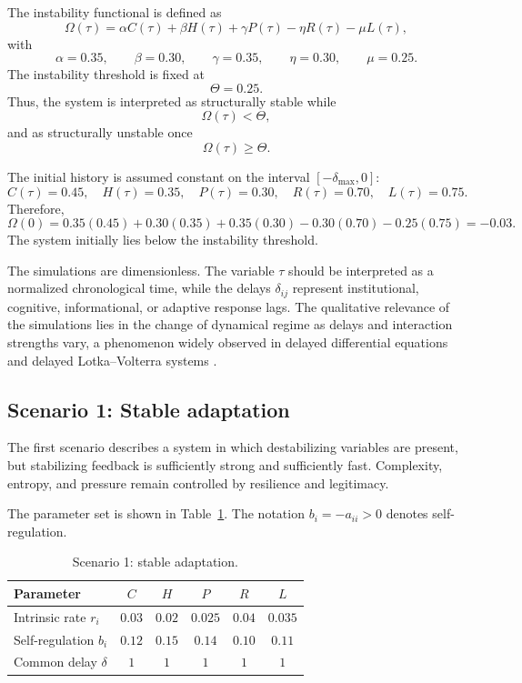 \documentclass[11pt]{article}
\begin{document}
The instability functional is defined as
\[
\Omega(\tau)
=
\alpha C(\tau)
+
\beta H(\tau)
+
\gamma P(\tau)
-
\eta R(\tau)
-
\mu L(\tau),
\]
with
\[
\alpha=0.35,\qquad
\beta=0.30,\qquad
\gamma=0.35,\qquad
\eta=0.30,\qquad
\mu=0.25.
\]
The instability threshold is fixed at
\[
\Theta=0.25.
\]
Thus, the system is interpreted as structurally stable while
\[
\Omega(\tau)<\Theta,
\]
and as structurally unstable once
\[
\Omega(\tau)\geq\Theta.
\]

The initial history is assumed constant on the interval \([-\delta_{\max},0]\):
\[
C(\tau)=0.45,\quad
H(\tau)=0.35,\quad
P(\tau)=0.30,\quad
R(\tau)=0.70,\quad
L(\tau)=0.75.
\]
Therefore,
\[
\Omega(0)
=
0.35(0.45)+0.30(0.35)+0.35(0.30)-0.30(0.70)-0.25(0.75)
=
-0.03.
\]
The system initially lies below the instability threshold.

The simulations are dimensionless. The variable \(\tau\) should be interpreted as a normalized chronological time, while the delays \(\delta_{ij}\) represent institutional, cognitive, informational, or adaptive response lags. The qualitative relevance of the simulations lies in the change of dynamical regime as delays and interaction strengths vary, a phenomenon widely observed in delayed differential equations and delayed Lotka--Volterra systems \cite{rihan2021dde,saeedian2022delay,chenjiang2021turinghopf}.

\subsection{Scenario 1: Stable adaptation}

The first scenario describes a system in which destabilizing variables are present, but stabilizing feedback is sufficiently strong and sufficiently fast. Complexity, entropy, and pressure remain controlled by resilience and legitimacy.

The parameter set is shown in Table~\ref{tab:scenario1}. The notation \(b_i=-a_{ii}>0\) denotes self-regulation.

\begin{table}[h!]
	\centering
	\caption{Scenario 1: stable adaptation.}
	\label{tab:scenario1}
	\begin{tabular}{lccccc}
		\toprule
		Parameter & \(C\) & \(H\) & \(P\) & \(R\) & \(L\) \\
		\midrule
		Intrinsic rate \(r_i\) & \(0.03\) & \(0.02\) & \(0.025\) & \(0.04\) & \(0.035\) \\
		Self-regulation \(b_i\) & \(0.12\) & \(0.15\) & \(0.14\) & \(0.10\) & \(0.11\) \\
		Common delay \(\delta\) & \(1\) & \(1\) & \(1\) & \(1\) & \(1\) \\
		\bottomrule
	\end{tabular}
\end{table}
\end{document}

